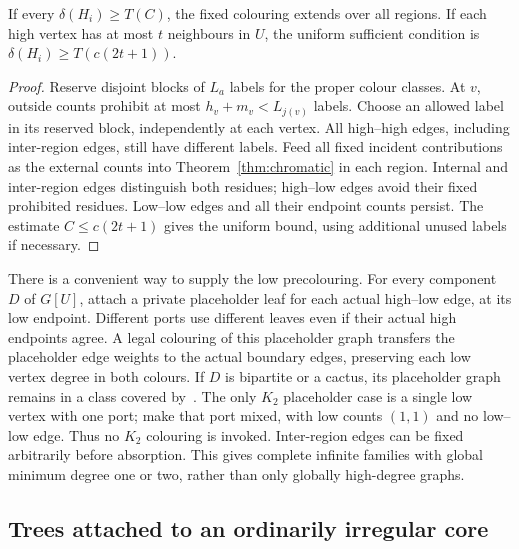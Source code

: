 \begin{theorem}\label{thm:crtregions}
If every $\delta(H_i)\ge T(C)$, the fixed colouring extends over
all regions. If each high vertex has at most $t$ neighbours in $U$,
the uniform sufficient condition is $\delta(H_i)\ge T(c(2t+1))$.
\end{theorem}
\begin{proof}
Reserve disjoint blocks of $L_a$ labels for the proper colour classes.
At $v$, outside counts prohibit at most $h_v+m_v<L_{j(v)}$ labels.
Choose an allowed label in its reserved block, independently at each
vertex. All high--high edges, including inter-region edges, still
have different labels. Feed all fixed incident contributions as the
external counts into Theorem~\ref{thm:chromatic} in each region.
Internal and inter-region edges distinguish both residues; high--low
edges avoid their fixed prohibited residues. Low--low edges and
all their endpoint counts persist. The estimate $C\le c(2t+1)$
gives the uniform bound, using additional unused labels if necessary.
\end{proof}

There is a convenient way to supply the low precolouring. For every
component $D$ of $G[U]$, attach a private placeholder leaf for each
actual high--low edge, at its low endpoint. Different ports use
different leaves even if their actual high endpoints agree. A legal
colouring of this placeholder graph transfers the placeholder edge
weights to the actual boundary edges, preserving each low vertex
degree in both colours. If $D$ is bipartite or a cactus, its
placeholder graph remains in a class covered by~\cite{GW23,GW24}.
The only $K_2$ placeholder case is a single low vertex with one
port; make that port mixed, with low counts $(1,1)$ and no low--low
edge. Thus no $K_2$ colouring is invoked. Inter-region edges can be
fixed arbitrarily before absorption. This gives complete infinite
families with global minimum degree one or two, rather than only
globally high-degree graphs.

\subsection{Trees attached to an ordinarily irregular core}\label{sec:irregularcore}

